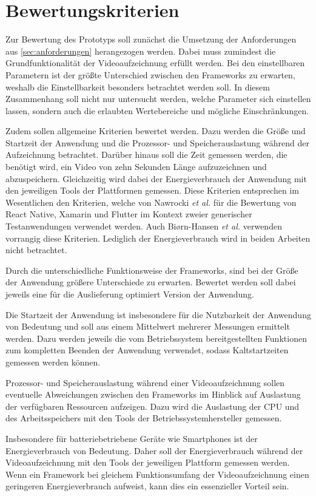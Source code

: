 \section{Bewertungskriterien}

Zur Bewertung des Prototyps soll zunächst die Umsetzung der Anforderungen aus \autoref{sec:anforderungen} herangezogen werden.
Dabei muss zumindest die Grundfunktionalität der Videoaufzeichnung erfüllt werden.
Bei den einstellbaren Parametern ist der größte Unterschied zwischen den Frameworks zu erwarten, weshalb die Einstellbarkeit besonders betrachtet werden soll.
In diesem Zusammenhang soll nicht nur untersucht werden, welche Parameter sich einstellen lassen, sondern auch die erlaubten Wertebereiche und mögliche Einschränkungen.


Zudem sollen allgemeine Kriterien bewertet werden.
Dazu werden die Größe und Startzeit der Anwendung und die Prozessor- und Speicherauslastung während der Aufzeichnung betrachtet.
Darüber hinaus soll die Zeit gemessen werden, die benötigt wird, ein Video von zehn Sekunden Länge aufzuzeichnen und abzuspeichern.
Gleichzeitig wird dabei der Energieverbrauch der Anwendung mit den jeweiligen Tools der Plattformen gemessen.
Diese Kriterien entsprechen im Wesentlichen den Kriterien, welche von Nawrocki \textit{et al.} \cite{Nawrocki_Comparison_Hybrid_Native_Frameworks} für die Bewertung von React Native, Xamarin und Flutter im Kontext zweier generischer Testanwendungen verwendet werden.
Auch Bi{\o}rn-Hansen \textit{et al.} \cite{Biorn-Hansen_PerformanceOverhead_CrossPlatform} verwenden vorrangig diese Kriterien.
Lediglich der Energieverbrauch wird in beiden Arbeiten nicht betrachtet.

Durch die unterschiedliche Funktionsweise der Frameworks, sind bei der Größe der Anwendung größere Unterschiede zu erwarten.
Bewertet werden soll dabei jeweils eine für die Auslieferung optimiert Version der Anwendung.

Die Startzeit der Anwendung ist insbesondere für die Nutzbarkeit der Anwendung von Bedeutung und soll aus einem Mittelwert mehrerer Messungen ermittelt werden.
Dazu werden jeweils die vom Betriebssystem bereitgestellten Funktionen zum kompletten Beenden der Anwendung verwendet, sodass Kaltstartzeiten gemessen werden können.

Prozessor- und Speicherauslastung während einer Videoaufzeichnung sollen eventuelle Abweichungen zwischen den Frameworks im Hinblick auf Auslastung der verfügbaren Ressourcen aufzeigen.
Dazu wird die Auslastung der CPU und des Arbeitsspeichers mit den Tools der Betriebssystemhersteller gemessen.

Insbesondere für batteriebetriebene Geräte wie Smartphones ist der Energieverbrauch von Bedeutung.
Daher soll der Energieverbrauch während der Videoaufzeichnung mit den Tools der jeweiligen Plattform gemessen werden.
Wenn ein Framework bei gleichem Funktionsumfang der Videoaufzeichnung einen geringeren Energieverbrauch aufweist, kann dies ein essenzieller Vorteil sein.